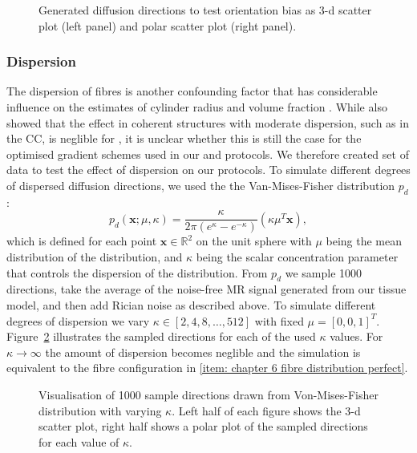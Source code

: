 \begin{figure}[h]
    \centering
	  \ifdraft
	  {
	  	\draftpic
	  }
	  {
	  	
	  }
	
        \caption{Generated diffusion directions to test orientation bias as 3-d scatter plot (left panel) and polar scatter plot (right panel).}
    \label{fig:chapter7 exp1 Ang Error dirs}
\end{figure}

\subsubsection*{Dispersion}
The dispersion of fibres is another confounding factor that has considerable influence on the estimates of cylinder radius and volume fraction \cite{Zhang:2011}. While \citep{Zhang:2011} also showed that the effect in coherent structures with moderate dispersion, such as in the CC, is neglible for {\OI}, it is unclear whether this is still the case for the optimised gradient schemes used in our {\SF} and {\DO} protocols. We therefore created set of data to test the effect of dispersion on our protocols. To simulate different degrees of dispersed diffusion directions, we used the the Van-Mises-Fisher distribution $p_{d}$:
\begin{equation}
	p_{d}(\mathbf{x}; \mu, \kappa)=\frac {\kappa} {2\pi(e^{\kappa}-e^{-\kappa})} \left( {\kappa \mu^T \mathbf{x} } \right),
\end{equation}
which is defined for each point $\mathbf{x} \in \mathbb{R}^2$ on the unit sphere with $\mu$ being the mean distribution of the distribution, and $\kappa$ being the scalar concentration parameter that controls the dispersion of the distribution. From $p_d$ we sample 1000 directions, take the average of the noise-free MR signal generated from our tissue model, and then add Rician noise as described above. To simulate different degrees of dispersion we vary $\kappa \in [2,4,8,\dots,512]$ with fixed $\mu=[0,0,1]^T$. Figure~\ref{fig:chapter7 exp1 VanMises draw} illustrates the sampled directions for each of the used $\kappa$ values. For $\kappa\rightarrow\infty$ the amount of dispersion becomes neglible and the simulation is equivalent to the fibre configuration in \ref{item: chapter 6 fibre distribution perfect}.


\begin{figure}[h]
    \centering 	
  \ifdraft
  {
  	\draftpic
  }
  {	
		 \caption{Visualisation of 1000 sample directions drawn from Von-Mises-Fisher distribution with varying $\kappa$. Left half of each figure shows the 3-d scatter plot, right half shows a polar plot of the sampled directions for each value of $\kappa$.}
  }
  \label{fig:chapter7 exp1 VanMises draw}
 \end{figure}

